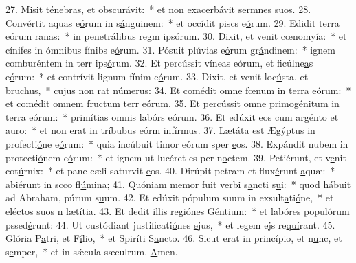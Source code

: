 27. Misit ténebras, et \uline{o}bscur\uline{á}vit:~* et non exacerbávit sermnes s\uline{u}os.
28. Convértit aquas e\uline{ó}rum in s\uline{á}nguinem:~* et occídit piscs e\uline{ó}rum.
29. Edidit terra e\uline{ó}rum r\uline{a}nas:~* in penetrálibus regm ips\uline{ó}rum.
30. Dixit, et venit cœn\uline{o}my\uline{í}a:~* et cínifes in ómnibus fínibs e\uline{ó}rum.
31. Pósuit plúvias e\uline{ó}rum gr\uline{á}ndinem:~* ignem comburéntem in terr ips\uline{ó}rum.
32. Et percússit víneas eórum, et ficúlne\uline{a}s e\uline{ó}rum:~* et contrívit lignum fínim e\uline{ó}rum.
33. Dixit, et venit loc\uline{ú}sta, et br\uline{u}chus,~* cujus non rat n\uline{ú}merus:
34. Et comédit omne fœnum in t\uline{e}rra e\uline{ó}rum:~* et comédit omnem fructum terr e\uline{ó}rum.
35. Et percússit omne primogénitum in t\uline{e}rra e\uline{ó}rum:~* primítias omnis labórs e\uline{ó}rum.
36. Et edúxit eos cum arg\uline{é}nto et \uline{au}ro:~* et non erat in tríbubus eórm inf\uline{í}rmus.
37. Lætáta est Ægýptus in profecti\uline{ó}ne e\uline{ó}rum:~* quia incúbuit timor eórum sper \uline{e}os.
38. Expándit nubem in protecti\uline{ó}nem e\uline{ó}rum:~* et ignem ut lucéret es per n\uline{o}ctem.
39. Petiérunt, et v\uline{e}nit cot\uline{ú}rnix:~* et pane cæli saturvit \uline{e}os.
40. Dirúpit petram et flux\uline{é}runt \uline{a}quæ:~* abiérunt in scco fl\uline{ú}mina;
41. Quóniam memor fuit verbi s\uline{a}ncti s\uline{u}i:~* quod hábuit ad Abraham, púrum s\uline{u}um.
42. Et edúxit pópulum suum in exsult\uline{a}ti\uline{ó}ne,~* et eléctos suos n læt\uline{í}tia.
43. Et dedit illis regi\uline{ó}nes G\uline{é}ntium:~* et labóres populórum pssed\uline{é}runt:
44. Ut custódiant justificati\uline{ó}nes \uline{e}jus,~* et legem ejs re\uline{quí}rant.
45. Glória P\uline{a}tri, et F\uline{í}lio,~* et Spiríti S\uline{a}ncto.
46. Sicut erat in princípio, et n\uline{u}nc, et s\uline{e}mper,~* et in sǽcula sæculrum. \uline{A}men.
